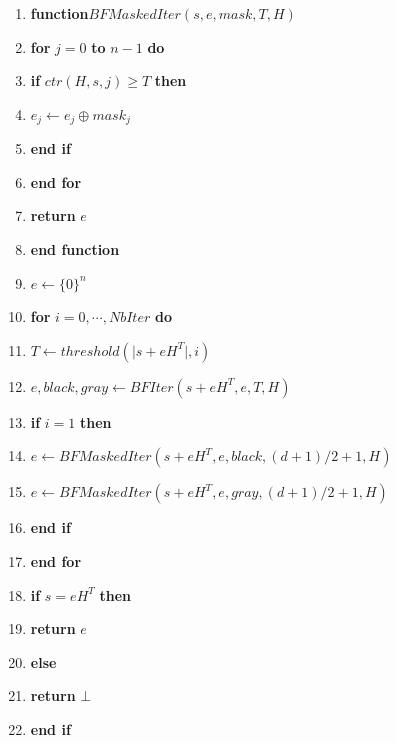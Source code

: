 \documentclass[12pt,openany]{report}
\begin{document}
\begin{itemize}
\begin{enumerate}
  \item \textbf{function}\hspace{0.2cm}$BFMaskedIter(s,e,mask,T,\mathit{H})$
  \item \hspace{0.5cm} \textbf{for} $j=0$ \textbf{to} $n-1$ \textbf{do}
   \item \hspace{0.9cm} \textbf{if} $ctr(\mathit{H},s,j)\geq T$ \textbf{then}
    \item \hspace{1.3cm} $e_j \gets e_j \oplus mask_j$
    \item \hspace{0.9cm} \textbf{end if}
  \item \hspace{0.5cm} \textbf{end for}
  \item \hspace{0.2cm} \textbf{return}\hspace{0.2cm} $e$
  \item \textbf{end function}
  \item $e\gets \lbrace 0 \rbrace^n$
  \item \textbf{for} $i=0,\cdots,NbIter$ \textbf{do}
   \item \hspace{0.9cm} $T \gets threshold(\mid s+e\mathit{H}^T\mid,i)$
   \item \hspace{0.9cm} $e,black,gray \gets BFIter(s+e\mathit{H}^T,e,T,\mathit{H})$
   
   \item \hspace{0.9cm} \textbf{if} $i=1$ \textbf{then}
   \item \hspace{1.3cm} $e\gets BFMaskedIter(s+e\mathit{H}^T,e,black,(d+1)/2+1,\mathit{H})$
   \item \hspace{1.3cm} $e\gets BFMaskedIter(s+e\mathit{H}^T,e,gray,(d+1)/2+1,\mathit{H})$
    \item \hspace{0.9cm} \textbf{end if}
  \item \textbf{end for}
  \item \textbf{if} $ s=e\mathit{H}^T $ \textbf{then}
  \item \hspace{0.5cm} \textbf{return} \hspace{0.3cm} $e$
  \item \textbf{else}
  \item \hspace{0.5cm} \textbf{return} \hspace{0.3cm} $\bot$
  \item \textbf{end if}
   
  
  \end{enumerate}
\end{itemize}
\end{document}
